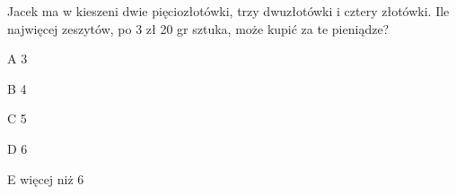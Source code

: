 \begin{tresc}
Jacek ma w kieszeni dwie pięciozłotówki, trzy dwuzłotówki i cztery złotówki. Ile najwięcej zeszytów, po 3 zł 20 gr sztuka, może kupić za te pieniądze?
\end{tresc}
\begin{wariant}{A} 3 \end{wariant}
\begin{wariant}{B} 4 \end{wariant}
\begin{wariant}{C} 5 \end{wariant}
\begin{wariant}{D} 6 \end{wariant}
\begin{wariant}{E} więcej niż 6 \end{wariant}
